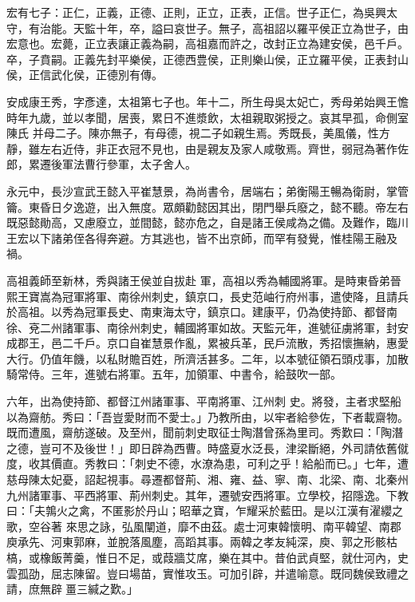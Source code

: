 \begin{pinyinscope}
 宏有七子：正仁，正義，正德、正則，正立，正表，正信。世子正仁，為吳興太守，有治能。天監十年，卒，謚曰哀世子。無子，高祖詔以羅平侯正立為世子，由宏意也。宏薨，正立表讓正義為嗣，高祖嘉而許之，改封正立為建安侯，邑千戶。卒，子賁嗣。正義先封平樂侯，正德西豊侯，正則樂山侯，正立羅平侯，正表封山侯，正信武化侯，正德別有傳。



 安成康王秀，字彥達，太祖第七子也。年十二，所生母吳太妃亡，秀母弟始興王憺時年九歲，並以孝聞，居喪，累日不進漿飲，太祖親取粥授之。哀其早孤，命側室陳氏
 并母二子。陳亦無子，有母德，視二子如親生焉。秀既長，美風儀，性方靜，雖左右近侍，非正衣冠不見也，由是親友及家人咸敬焉。齊世，弱冠為著作佐郎，累遷後軍法曹行參軍，太子舍人。



 永元中，長沙宣武王懿入平崔慧景，為尚書令，居端右；弟衡陽王暢為衛尉，掌管籥。東昏日夕逸遊，出入無度。眾頗勸懿因其出，閉門舉兵廢之，懿不聽。帝左右既惡懿勛高，又慮廢立，並間懿，懿亦危之，自是諸王侯咸為之備。及難作，臨川王宏以下諸弟侄各得奔避。方其逃也，皆不出京師，而罕有發覺，惟桂陽王融及禍。



 高祖義師至新林，秀與諸王侯並自拔赴
 軍，高祖以秀為輔國將軍。是時東昏弟晉熙王寶嵩為冠軍將軍、南徐州刺史，鎮京口，長史范岫行府州事，遣使降，且請兵於高祖。以秀為冠軍長史、南東海太守，鎮京口。建康平，仍為使持節、都督南徐、兗二州諸軍事、南徐州刺史，輔國將軍如故。天監元年，進號征虜將軍，封安成郡王，邑二千戶。京口自崔慧景作亂，累被兵革，民戶流散，秀招懷撫納，惠愛大行。仍值年饑，以私財贍百姓，所濟活甚多。二年，以本號征領石頭戍事，加散騎常侍。三年，進號右將軍。五年，加領軍、中書令，給鼓吹一部。



 六年，出為使持節、都督江州諸軍事、平南將軍、江州刺
 史。將發，主者求堅船以為齋舫。秀曰：「吾豈愛財而不愛士。」乃教所由，以牢者給參佐，下者載齋物。既而遭風，齋舫遂破。及至州，聞前刺史取征士陶潛曾孫為里司。秀歎曰：「陶潛之德，豈可不及後世！」即日辟為西曹。時盛夏水泛長，津梁斷絕，外司請依舊僦度，收其價直。秀教曰：「刺史不德，水潦為患，可利之乎！給船而已。」七年，遭慈母陳太妃憂，詔起視事。尋遷都督荊、湘、雍、益、寧、南、北梁、南、北秦州九州諸軍事、平西將軍、荊州刺史。其年，遷號安西將軍。立學校，招隱逸。下教曰：「夫鶉火之禽，不匿影於丹山；昭華之寶，乍耀采於藍田。是以江漢有濯纓之歌，空谷著
 來思之詠，弘風闡道，靡不由茲。處士河東韓懷明、南平韓望、南郡庾承先、河東郭麻，並脫落風塵，高蹈其事。兩韓之孝友純深，庾、郭之形骸枯槁，或橡飯菁羹，惟日不足，或葭牆艾席，樂在其中。昔伯武貞堅，就仕河內，史雲孤劭，屈志陳留。豈曰場苗，實惟攻玉。可加引辟，并遣喻意。既同魏侯致禮之請，庶無辟畺三緘之歎。」




\end{pinyinscope}
